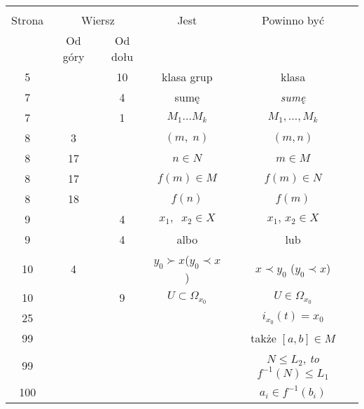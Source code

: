 \documentclass[a4paper,11pt]{article}
\begin{document}







\begin{center}

  \begin{tabular}{|c|c|c|c|c|}
    \hline
    & \multicolumn{2}{c|}{} & & \\
    Strona & \multicolumn{2}{c|}{Wiersz} & Jest
                              & Powinno być \\ \cline{2-3}
    & Od góry & Od dołu & & \\
    \hline
    5   & & 10 & klasa grup & klasa \\
    7   & &  4 & sumę & \textit{sumę} \\
    7   & &  1 & $M_{ 1 } \ldots M_{ k }$ & $M_{ 1 }, \ldots, M_{ k }$ \\
    8   &  3 & & $( m,\; n )$ & $( m, n )$ \\
    8   & 17 & & $n \in N$ & $m \in M$ \\
    8   & 17 & & $f( m ) \in M$ & $f( m ) \in N$ \\
    8   & 18 & & $f( n )$ & $f( m )$ \\
    9   & &  4 & $x_{ 1 },\;\; x_{ 2 } \in X$ & $x_{ 1 },\, x_{ 2 } \in X$ \\
    9   & &  4 & albo & lub \\
    10  &  4 & & $y_{ 0 } \succ x$($y_{ 0 } \prec x$)
           & $x \prec y_{ 0 }$ ($y_{ 0 } \prec x$) \\
    10  & &  9 & $U \subset \Omega_{ x_{ 0 } }$ & $U \in \Omega_{ x_{ 0 } }$ \\
    25  & & & & $i_{ x_{ 0 } }( t ) = x_{ 0 }$ \\
    99  & & & & także $[ a, b ] \in M$ \\
    99  & & & & $N \leq L_{ 2 }$, \textit{to} $f^{ -1 }( N ) \leq L_{ 1 }$ \\
    100 & & & & $a_{ i } \in f^{ -1 }( b_{ i } )$ \\
    \hline
  \end{tabular}

\end{center}
\end{document}

